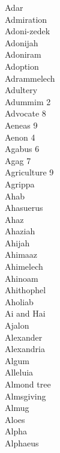 Adar  \\
Admiration  \\
Adoni-zedek  \\
Adonijah  \\
Adoniram  \\
Adoption  \\
Adrammelech  \\
Adultery  \\
Adummim \hfill 2 \\
Advocate \hfill 8 \\
Aeneas \hfill 9 \\
Aenon \hfill 4 \\
Agabus \hfill 6 \\
Agag \hfill 7 \\
Agriculture \hfill 9 \\
Agrippa  \\
Ahab  \\
Ahasuerus  \\
Ahaz  \\
Ahaziah  \\
Ahijah  \\
Ahimaaz  \\
Ahimelech  \\
Ahinoam  \\
Ahithophel  \\
Aholiab  \\
Ai and Hai  \\
Ajalon  \\
Alexander  \\
Alexandria  \\
Algum  \\
Alleluia  \\
Almond tree  \\
Almsgiving  \\
Almug  \\
Aloes  \\
Alpha  \\
Alphaeus  \\
